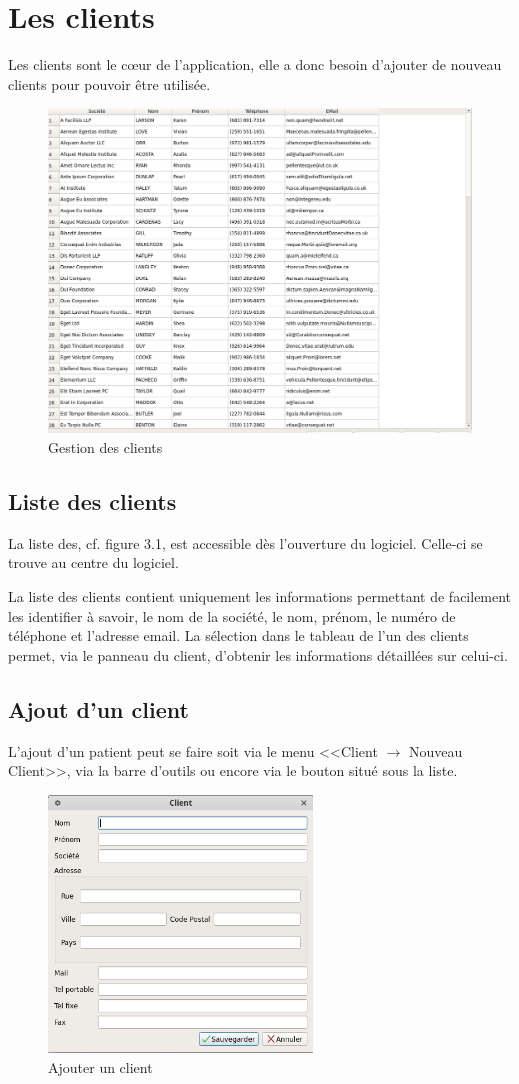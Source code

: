 \chapter{Les clients}
Les clients sont le cœur de l'application, elle a donc besoin d'ajouter de nouveau clients pour pouvoir être utilisée. 
\begin{figure}[H]
	\centering
	\includegraphics[width=12cm]{screens/clients.png}
	\caption{Gestion des clients}
\end{figure}

\section{Liste des clients}
La liste des, cf. figure 3.1, est accessible dès l’ouverture du logiciel. Celle-ci se trouve au centre du logiciel. 

La liste des clients contient uniquement les informations permettant de facilement les identifier à savoir, le nom de la société, le nom,
prénom, le numéro de téléphone et l’adresse email. La sélection dans le tableau de l’un des clients permet, via le panneau du client,
d’obtenir les informations détaillées sur celui-ci. 

\section{Ajout d'un client}
L'ajout d’un patient peut se faire soit via le menu <<Client $\rightarrow$ Nouveau Client>>, via la barre d'outils ou encore via le bouton situé sous la
liste. 
\begin{figure}[H]
	\centering
	\includegraphics[width=7cm]{screens/ajouterClient.png}
	\caption{Ajouter un client}
\end{figure}

